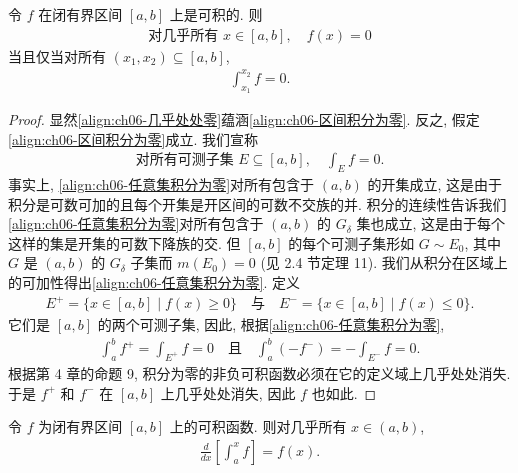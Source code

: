 \documentclass[../../main.tex]{subfiles}
\begin{document}
\begin{lemma}\label{lemma:ch06-积分为零}
令 $f$ 在闭有界区间 $[a,b]$ 上是可积的. 则
\begin{align}
\text{对几乎所有 }x\in[a,b],\quad f(x)=0\label{align:ch06-几乎处处零}
\end{align}
当且仅当对所有 $(x_{1},x_{2})\subseteq[a,b]$,
\begin{align}
\int_{x_{1}}^{x_{2}}f=0.\label{align:ch06-区间积分为零}
\end{align}
\end{lemma}

\begin{proof}
显然\eqref{align:ch06-几乎处处零}蕴涵\eqref{align:ch06-区间积分为零}. 反之, 假定\eqref{align:ch06-区间积分为零}成立. 我们宣称
\begin{align}
\text{对所有可测子集 }E\subseteq[a,b],\quad\int_{E}f=0.\label{align:ch06-任意集积分为零}
\end{align}
事实上, \eqref{align:ch06-任意集积分为零}对所有包含于 $(a,b)$ 的开集成立, 这是由于积分是可数可加的且每个开集是开区间的可数不交族的并. 积分的连续性告诉我们\eqref{align:ch06-任意集积分为零}对所有包含于 $(a,b)$ 的 $G_{\delta}$ 集也成立, 这是由于每个这样的集是开集的可数下降族的交. 但 $[a,b]$ 的每个可测子集形如 $G\sim E_{0}$, 其中 $G$ 是 $(a,b)$ 的 $G_{\delta}$ 子集而 $m(E_{0})=0$ (见 2.4 节定理 11). 我们从积分在区域上的可加性得出\eqref{align:ch06-任意集积分为零}. 定义
\begin{align*}
E^{+}=\{x\in[a,b]\mid f(x)\geqslant 0\}\quad\text{与}\quad E^{-}=\{x\in[a,b]\mid f(x)\leqslant 0\}.
\end{align*}
它们是 $[a,b]$ 的两个可测子集, 因此, 根据\eqref{align:ch06-任意集积分为零},
\begin{align*}
\int_{a}^{b}f^{+}=\int_{E^{+}}f=0\quad\text{且}\quad\int_{a}^{b}(-f^{-})=-\int_{E^{-}}f=0.
\end{align*}
根据第 4 章的命题 9, 积分为零的非负可积函数必须在它的定义域上几乎处处消失. 于是 $f^{+}$ 和 $f^{-}$ 在 $[a,b]$ 上几乎处处消失, 因此 $f$ 也如此.
\end{proof}

\begin{theorem}\label{theorem:ch06-微分基本定理}
令 $f$ 为闭有界区间 $[a,b]$ 上的可积函数. 则对几乎所有 $x\in(a,b)$,
\begin{align}
\frac{d}{dx}\left[\int_{a}^{x}f\right]=f(x).\label{align:ch06-微分等式}
\end{align}
\end{theorem}
\end{document}
